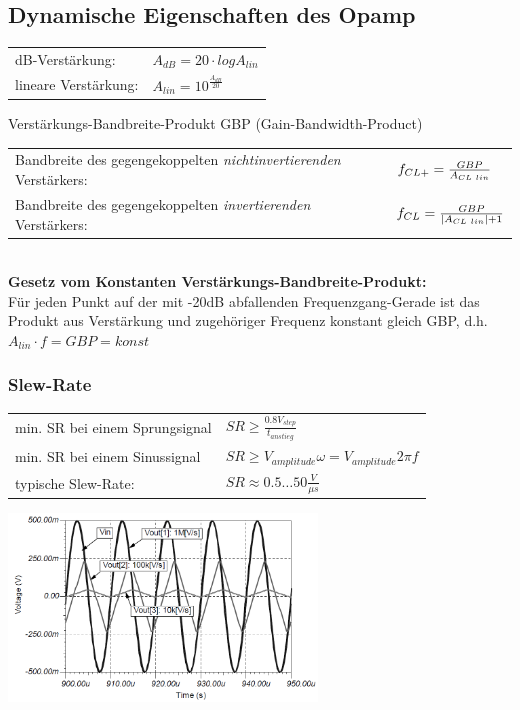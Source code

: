 	\subsection{Dynamische Eigenschaften des Opamp}
		\begin{tabular}{ll}
			dB-Verstärkung:&
			$A_{dB}=20 \cdot log A_{lin}$\\
			lineare Verstärkung:&
			$A_{lin}=10^{\frac{A_{dB}}{20}}$\\
		\end{tabular}
		Verstärkungs-Bandbreite-Produkt GBP (Gain-Bandwidth-Product)\\
		\begin{tabular}{ll}
			Bandbreite des gegengekoppelten {\it nichtinvertierenden} Verstärkers:&
			$f_{CL+}=\frac{GBP}{A_{CL \hspace{1mm}lin}}$\\
			Bandbreite des gegengekoppelten {\it invertierenden} Verstärkers: &
			$f_{CL}=\frac{GBP}{\left| A_{CL \hspace{1mm}lin}\right|+1}$\\
		\end{tabular}\\
		{\bf Gesetz vom Konstanten Verstärkungs-Bandbreite-Produkt:} \\
		Für jeden Punkt auf der mit -20dB abfallenden Frequenzgang-Gerade ist das
		Produkt aus Verstärkung und zugehöriger Frequenz konstant gleich GBP, d.h. $A_{lin}\cdot f=GBP=konst$\\
		\subsubsection{Slew-Rate}
			\begin{tabular}{ll}
				min. SR bei einem Sprungsignal &
				$SR\geq\frac{0.8V_{step}}{t_{anstieg}}$\\ 
				min. SR bei einem Sinussignal & 
				$SR\geq V_{amplitude}\omega=V_{amplitude}2\pi f$\\
				typische Slew-Rate: & $SR \approx 0.5 \dots 50 \frac{V}{\mu s}$
			\end{tabular}

			\includegraphics[height=5cm]{./images/slew-rate.png}\\

